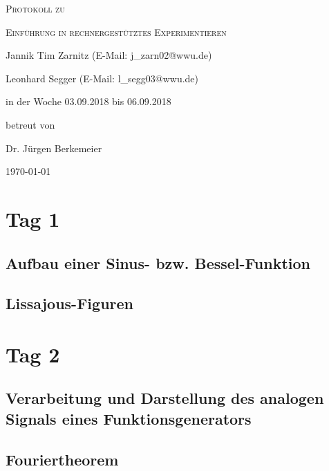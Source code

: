 \documentclass[
	a4paper,
	12pt,
	pagesize,
	ngerman
]{scrartcl}
\begin{document}
	
	\begin{titlepage}
		\centering
		{\scshape\LARGE Protokoll zu \par}
		\vspace{1cm}
		{\scshape\huge Einführung in rechnergestütztes Experimentieren \par}
		\vspace{3cm}
		
		{\large Jannik Tim Zarnitz (E-Mail: j\_zarn02@wwu.de) \par}
		{\large Leonhard Segger (E-Mail: l\_segg03@wwu.de) \par}
		\vfill
		
		in der Woche 03.09.2018 bis 06.09.2018\par
		betreut von\par
		{\large Dr. Jürgen Berkemeier}
		
		\vfill
		
		{\large \today\par}
	\end{titlepage}
	\tableofcontents
	\newpage

	\section{Tag 1} \label{Tag 1}
	
	\subsection{Aufbau einer Sinus- bzw. Bessel-Funktion}
	
	
	
	\subsection{Lissajous-Figuren}
	
	
	
	\section{Tag 2} \label{Tag 2}
	
	\subsection{Verarbeitung und Darstellung des analogen Signals eines Funktionsgenerators} %
	
	\subsection{Fouriertheorem}
	
\end{document}
